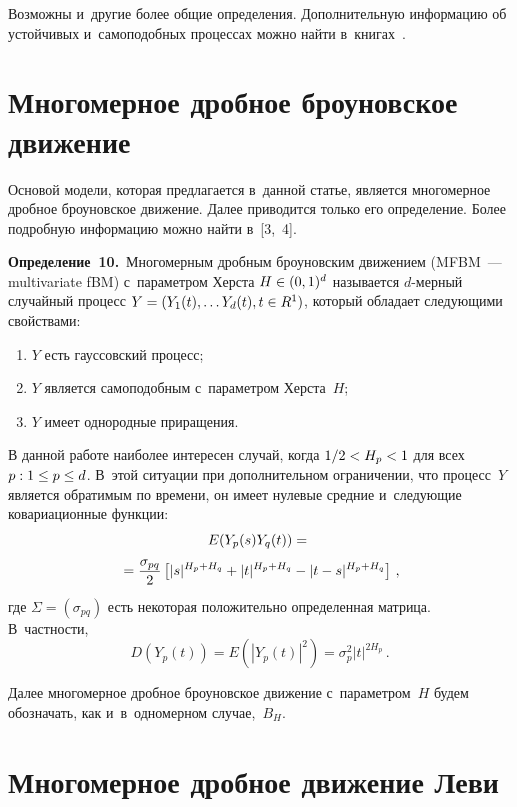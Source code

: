 \begin{multicols}{2}
\smallskip

Возможны и~другие более общие определения. Дополнительную информацию об устойчивых и~самоподобных процессах
можно найти в~книгах~\cite{Sam94, Emb02}.

\section{Многомерное дробное броуновское движение}

Основой модели, которая предлагается в~данной статье, является
многомерное дробное броуновское движение. Далее приводится только
его определение. Более подробную информацию можно найти в~[3,~4].

\smallskip

\noindent
\textbf{Определение~10.}\
Многомерным дробным броуновским движением (MFBM~--- multivariate fBM) с~параметром Херста $H\hm\in (0,1)^d$ 
называется $d$-мер\-ный случайный процесс
$Y\hm = (Y_1 (t) , \ldots Y_d (t) , t\hm\in R^1 )$, который обладает следующими свойствами:
\begin{enumerate}[(1)]
\item  $Y$ есть гауссовский процесс;

\item  $Y$ является самоподобным с~параметром Херс\-та~$H$;

\item  $Y$ имеет однородные приращения.
\end{enumerate}


В данной работе наиболее интересен случай, когда $1/2 \hm< H_p \hm<1$ для 
всех $p: 1\hm\leq p \hm\leq d$. В~этой ситуации при дополнительном ограничении, что 
процесс~$Y$ является обратимым по времени, он имеет нулевые средние и~следующие ковариационные функции:
\begin{multline*}
E(Y_p (s) Y_q (t)) ={}\\
{}= \displaystyle\frac{\displaystyle \sigma_{pq}\mathstrut}{\displaystyle 2\mathstrut}
\left[ |s|^{H_p + H_q} + |t|^{H_p + H_q} - |t-s|^{H_p + H_q} \right]  \,,
\end{multline*}
где $\Sigma = (\sigma_{pq} )$ есть некоторая положительно определенная матрица. 
В~частности,
\begin{equation*}
D(Y_p (t)) = E\left(|Y_p (t)|^2 \right) = \sigma_p^2 |t|^{2H_p}  \,.
\end{equation*}

Далее многомерное дробное броуновское движение с~параметром~$H$ будем обозначать, 
как и~в~одномерном случае,~$B_H$.

\section{Многомерное дробное движение Леви}


\end{multicols}
